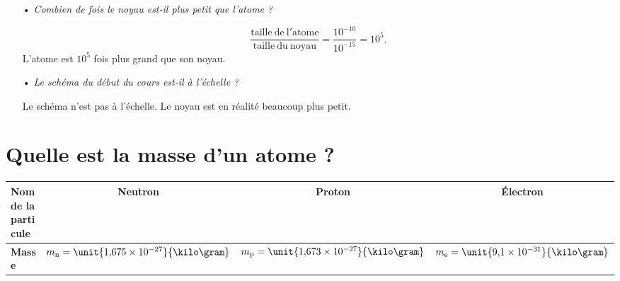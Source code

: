 \documentclass[12pt,a4paper]{article}
\begin{document}
\begin{itemize}
\item[•] \emph{Combien de fois le noyau est-il plus petit que l'atome ?}

\[
\frac{\mathrm{taille\ de\ l'atome}}{\mathrm{taille\ du\ noyau}} = \frac{10^{-10}}{10^{-15}} = 10^5.
\]
L'atome est $10^5$ fois plus grand que son noyau.

\item[•] \emph{Le schéma du début du cours est-il à l'échelle ?}

Le schéma n'est pas à l'échelle.
Le noyau est en réalité beaucoup plus petit.

\end{itemize}

\section{Quelle est la masse d'un atome ?}

\begin{center}
\begin{tabular}{l|c|c|c}
\textbf{Nom de la particule} & Neutron & Proton & Électron \\
\hline
\textbf{Masse} & $m_\mathrm{n} = \unit{1{,}675\times 10^{-27}}{\kilo\gram}$  & $m_\mathrm{p} = \unit{1{,}673\times 10^{-27}}{\kilo\gram}$ & $m_\mathrm{e} = \unit{9{,}1\times 10^{-31}}{\kilo\gram}$
\end{tabular}

\end{center}
\end{document}
